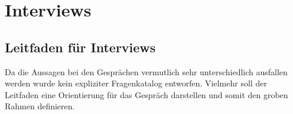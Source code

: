 \documentclass[Bachelorarbeit.tex]{subfiles}
\begin{document}
\chapter{Interviews}

\newpage
\section{Leitfaden für Interviews}
Da die Aussagen bei den Gesprächen vermutlich sehr unterschiedlich ausfallen werden wurde kein expliziter Fragenkatalog entworfen. Vielmehr soll der Leitfaden eine Orientierung für das Gespräch darstellen und somit den groben Rahmen definieren.

\begin{comment}
1. Allgemeine Angaben
a. Datum  
b. Dauer
2. Angaben zum Kontext
a. Wo wurde das Interview geführt
b. Gab es eine Einführung/Einleitung zum Interview
c. Welche Software/Medien (analog/digital) werden verwendet
3. Angaben zur Person
a. Alter
4. Angaben zum Unternehmen:
a. Selbstbezeichnung durch Proband_in  (KMU, ...)
b. ca. Anzahl der Mitarbeiter_innnen
5. Angaben zur Funktion im Unternehmen
a. Tätigkeit im Unternehmen
b. Planungsgrad der Tätigkeit:
i. Selbständig Planung, vorgegebene Grobplannung, etc.
c. Zuständigkeitsbereich
i. ... auf Stadt-, Bezirks-, Landes-, etc.

6. Ablauf des Standard Planungs-Workflows zeigen/erklären lassen (Schritt für Schritt)
7. Sonderfälle des Planungs-Workflows zeigen/erklären lassen (Schritt für Schritt)
8. Probleme und Engpässe des Planungs-Workflows zeigen/erklären lassen
9. Welche Verbesserung sind gewünscht (aus Domänen-Sicht)

\end{comment}
\end{document}

